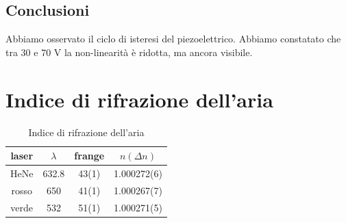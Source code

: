 \documentclass[a4paper]{article}
\begin{document}
\subsection{Conclusioni}
Abbiamo osservato il ciclo di isteresi del piezoelettrico. Abbiamo constatato che tra 30 e 70 V la non-linearità è ridotta, ma ancora visibile. 

\section{Indice di rifrazione dell'aria}

\begin{table}[H]
	\centering
	\begin{tabular}{|c|c|c|c|}
		\hline
		laser & $\lambda$ & frange  & $n(\Delta n)$ \\
		\hline
		HeNe & 632.8 & 43(1) &1.000272(6)\\
		rosso & 650 & 41(1) &1.000267(7)\\ 
		verde & 532 & 51(1) &1.000271(5)\\
		\hline
	\end{tabular}
	\caption{Indice di rifrazione dell'aria}
	\label{tab:n}
\end{table}
\end{document}
